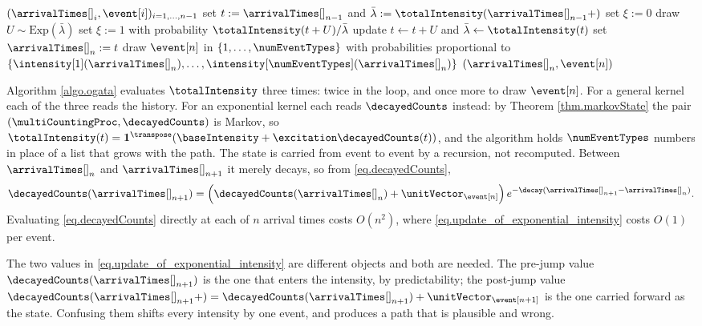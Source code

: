 \begin{algorithm}[h!]
 \caption{{Ogata's thinning algorithm \citep{Oga81lew}}}
 \label{algo.ogata}
 \begin{algorithmic}[5]
  \REQUIRE $(\arrivalTimes[]_i, \event[i])_{i=1,\dots,n-1}$
  \STATE set $t:=\arrivalTimes[]_{n-1}$ and
         $\bar{\lambda} := \totalIntensity(\arrivalTimes[]_{n-1}+)$
  \STATE set $\xi:=0$
  \STATE draw $U \sim \text{Exp}(\bar{\lambda})$
  \STATE set $\xi :=1$ with probability $\totalIntensity(t+U)/\bar{\lambda}$
  \STATE update $t\leftarrow t+U$ and $\bar{\lambda} \leftarrow \totalIntensity(t)$
  \ENDWHILE
  \STATE set $\arrivalTimes[]_n:=t$
  \STATE draw $\event[n]$ in $\lbrace 1,\dots,\numEventTypes\rbrace$ with probabilities
         proportional to
         $\lbrace \intensity[1](\arrivalTimes[]_n), \dots,
         \intensity[\numEventTypes](\arrivalTimes[]_n)\rbrace$
  \RETURN $(\arrivalTimes[]_n,\event[n])$
 \end{algorithmic}
\end{algorithm}

Algorithm \ref{algo.ogata} evaluates $\totalIntensity$ three times:
twice in the loop, and once more to draw $\event[n]$.
For a general kernel each of the three reads the history.
For an exponential kernel each reads $\decayedCounts$ instead:
by Theorem \ref{thm.markovState} the pair $(\multiCountingProc,\decayedCounts)$ is Markov, so
$\totalIntensity(t) = \mathbf{1}^{\transpose}(\baseIntensity + \excitation\decayedCounts(t))$,
and the algorithm holds $\numEventTypes$ numbers in place of a list that grows with the path.
The state is carried from event to event by a recursion, not recomputed.
Between $\arrivalTimes[ ]_{n}$ and $\arrivalTimes[ ]_{n+1}$ it merely decays,
so from \eqref{eq.decayedCounts},
\begin{equation}\label{eq.update_of_exponential_intensity}
 \decayedCounts(\arrivalTimes[ ]_{n+1})
 = \Big( \decayedCounts(\arrivalTimes[ ]_{n}) + \unitVector_{\event[n]} \Big)
 \, e^{-\decay (\arrivalTimes[ ]_{n+1} - \arrivalTimes[ ]_{n})} .
\end{equation}
Evaluating \eqref{eq.decayedCounts} directly at each of $n$ arrival times costs $O(n^2)$,
where \eqref{eq.update_of_exponential_intensity} costs $O(1)$ per event.

\begin{remark}\label{remark.prePostJump}
 The two values in \eqref{eq.update_of_exponential_intensity} are different objects and both
 are needed.
 The pre-jump value $\decayedCounts(\arrivalTimes[ ]_{n+1})$ is the one that enters the
 intensity, by predictability;
 the post-jump value
 $\decayedCounts(\arrivalTimes[ ]_{n+1}+)
 = \decayedCounts(\arrivalTimes[ ]_{n+1}) + \unitVector_{\event[n+1]}$
 is the one carried forward as the state.
 Confusing them shifts every intensity by one event,
 and produces a path that is plausible and wrong.
\end{remark}

